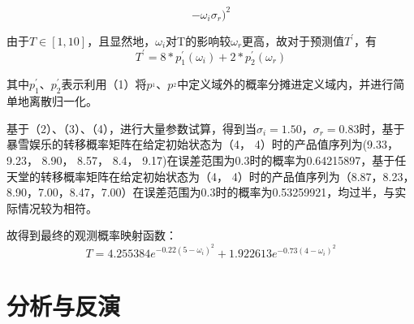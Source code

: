 \documentclass[hyperref]{ctexart}
\begin{document}
\begin{multicols}{2}
\begin{equation}
{{        - \omega_i}{\sigma_r})^2}
    \end{equation}\par
    由于$T \in [1,10]$，且显然地，$\omega_i$对T的影响较$\omega_r$更高，故对于预测值$T^'$，有
    \begin{equation}
        T^{'} = 8*p^{'}_1(\omega_i) + 2*p^{'}_2(\omega_r)
    \end{equation}\par
    其中$p^{'}_1$、$p^{'}_2$表示利用（1）将$p^_1$、$p^_2$中定义域外的概率分摊进定义域内，并进行简单地离散归一化。\par
    基于（2）、（3）、（4），进行大量参数试算，得到当$\sigma_i =1.50 $，$\sigma_r =0.83 $时，基于暴雪娱乐的转移概率矩阵在给定初始状态为（4， 4）时的产品值序列为(9.33， 9.23， 8.90， 8.57， 8.4， 9.17)在误差范围为0.3时的概率为0.64215897，基于任天堂的转移概率矩阵在给定初始状态为（4， 4）时的产品值序列为（8.87，8.23，8.90，7.00，8.47，7.00）在误差范围为0.3时的概率为0.53259921，均过半，与实际情况较为相符。\\\par
    故得到最终的观测概率映射函数：\\
    \begin{equation*}
        T = 4.255384e^{-0.22(5 - \omega_i)^2} + 1.922613e^{-0.73(4
        - \omega_i)^2}
    \end{equation*}\par
	    
	\section{分析与反演}

\end{multicols}
\end{document}
